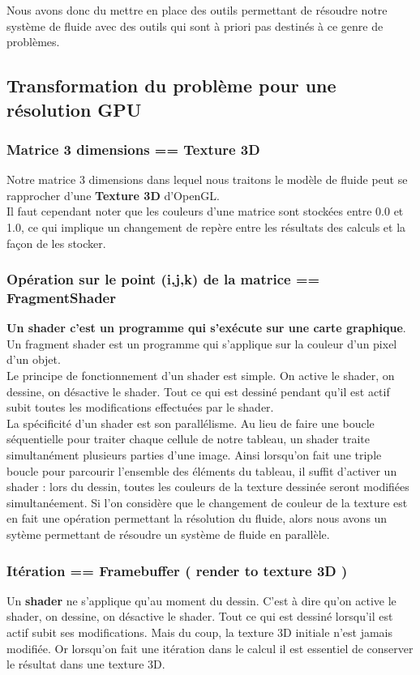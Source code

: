 \documentclass[a4paper,10pt]{article}
\begin{document}
Nous avons donc du mettre en place des outils permettant de résoudre
notre système de fluide avec des outils qui sont à priori pas destinés
à ce genre de problèmes.

\subsection{Transformation du problème pour une résolution GPU}

\subsubsection{Matrice 3 dimensions == Texture 3D}
Notre matrice 3 dimensions dans lequel nous traitons le modèle de
fluide peut se rapprocher d'une \textbf{Texture 3D} d'OpenGL. \\
Il faut cependant noter que les couleurs d'une matrice sont stockées entre 0.0 et 1.0,
ce qui implique un changement de repère entre les résultats des calculs
et la façon de les stocker.

\subsubsection{Opération sur le point (i,j,k) de la matrice == FragmentShader}
\textbf{Un shader c'est un programme qui s'exécute sur une carte graphique}. 
Un fragment shader est un programme qui s'applique sur la couleur d'un pixel d'un objet.\\ 

Le principe de fonctionnement d'un shader est simple. On active le
shader, on dessine, on désactive le shader. Tout ce qui est dessiné
pendant qu'il est actif subit toutes les modifications effectuées par
le shader.\\ 

La spécificité d'un shader est son parallélisme. Au lieu de faire une boucle séquentielle
pour traiter chaque cellule de notre tableau, un shader traite simultanément plusieurs 
parties d'une image. Ainsi lorsqu'on fait une triple boucle pour parcourir l'ensemble des
éléments du tableau, il suffit d'activer un shader : lors du dessin, toutes les couleurs de la texture dessinée  seront modifiées simultanéement. Si l'on considère que le changement de couleur de la texture est en fait une opération permettant la résolution du fluide, alors nous avons un sytème permettant de résoudre un système de fluide en parallèle.\\


\subsubsection{Itération == Framebuffer ( render to texture 3D ) }
Un \textbf{shader} ne s'applique qu'au moment du dessin.  C'est à dire
qu'on active le shader, on dessine, on désactive le shader. Tout ce
qui est dessiné lorsqu'il est actif subit ses modifications. Mais du
coup, la texture 3D initiale n'est jamais modifiée. Or lorsqu'on fait
une itération dans le calcul il est essentiel de conserver le résultat
dans une texture 3D.\\ 
\end{document}
